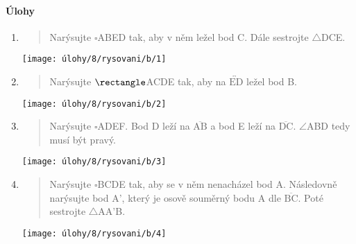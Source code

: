 \paragraph{Úlohy}
\begin{enumerate}
    \item
    \begin{minipage}[t]{\linewidth}
        \begin{quote}
            Narýsujte $\square$ABED tak, aby v něm ležel bod C. Dále sestrojte $\triangle$DCE\@.
        \end{quote}
        \centering
        \texttt{[image: úlohy/8/rysovani/b/1]}

    \end{minipage}

    \item
    \begin{minipage}[t]{\linewidth}
        \begin{quote}
            Narýsujte $\rectangle$ACDE tak, aby na $\overleftrightarrow{\text{ED}}$ ležel bod B\@.
        \end{quote}
        \centering
        \texttt{[image: úlohy/8/rysovani/b/2]}

    \end{minipage}

    \item
    \begin{minipage}[t]{\linewidth}
        \begin{quote}
            Narýsujte $\square$ADEF. Bod D leží na $\overline{\text{AB}}$ a bod E leží na $\overline{\text{DC}}$. $\angle$ABD tedy musí být pravý.
        \end{quote}
        \centering
        \texttt{[image: úlohy/8/rysovani/b/3]}

    \end{minipage}

    \item
    \begin{minipage}[t]{\linewidth}
        \begin{quote}
            Narýsujte $\square$BCDE tak, aby se v něm nenacházel bod A. Následovně narýsujte bod A', který je osově souměrný bodu A dle $\overline{\text{BC}}$.
            Poté sestrojte $\triangle$AA'B.
        \end{quote}
        \centering
        \texttt{[image: úlohy/8/rysovani/b/4]}

    \end{minipage}


\end{enumerate}
